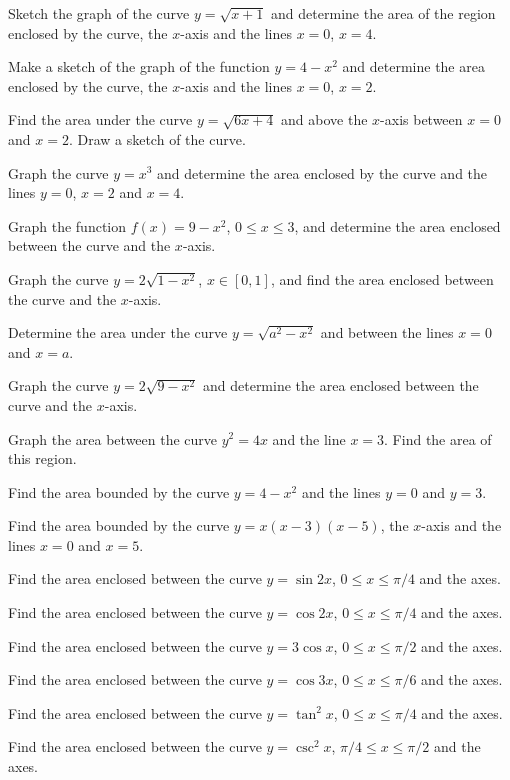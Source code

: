 \begin{multicols}{2}
  \problem Sketch the graph of the curve $y=\sqrt{x+1}$ and determine the
  area of the region enclosed by the curve, the $x$-axis and the lines $x=0$,
  $x=4$.


  \problem Make a sketch of the graph of the function $y=4-x^2$ and determine
  the area enclosed by the curve, the $x$-axis and the lines $x=0$, $x=2$.


  \problem Find the area under the curve $y=\sqrt{6x+4}$ and above the
  $x$-axis between $x=0$ and $x=2$.  Draw a sketch of the curve.


  \problem Graph the curve $y=x^3$ and determine the area enclosed by the
  curve and the lines $y=0$, $x=2$ and $x=4$.




  \problem Graph the function $f(x)=9-x^2$, $0\le x\le 3$, and determine the
  area enclosed between the curve and the $x$-axis.


  \problem Graph the curve $y=2\sqrt{1-x^2}$, $x\in [0,1]$, and find the area
  enclosed between the curve and the $x$-axis.


  \problem Determine the area under the curve $y=\sqrt{a^2-x^2}$ and between
  the lines $x=0$ and $x=a$.


  \problem Graph the curve $y=2\sqrt{9-x^2}$ and determine the area enclosed
  between the curve and the $x$-axis.


  \problem Graph the area between the curve $y^2=4x$ and the line $x=3$.
  Find the area of this region.


  \problem Find the area bounded by the curve $y=4-x^2$ and the lines $y=0$
  and $y=3$.


  \problem Find the area bounded by the curve $y=x(x-3)(x-5)$, the $x$-axis
  and the lines $x=0$ and $x=5$.


  \problem Find the area enclosed between the curve $y=\sin 2x$, $0\le x\le
  \pi/4$ and the axes.


  \problem Find the area enclosed between the curve $y=\cos 2x$, $0\le x\le
  \pi/4$ and the axes.


  \problem Find the area enclosed between the curve $y=3\cos x$, $0\le x\le
  \pi/2$ and the axes.


  \problem Find the area enclosed between the curve $y=\cos 3x$, $0\le x\le
  \pi/6$ and the axes.


  \problem Find the area enclosed between the curve $y=\tan^2 x$, $0\le x\le
  \pi/4$ and the axes.


  \problem Find the area enclosed between the curve $y=\csc^2 x$, $\pi/4\le
  x\le \pi/2$ and the axes.



\end{multicols}

